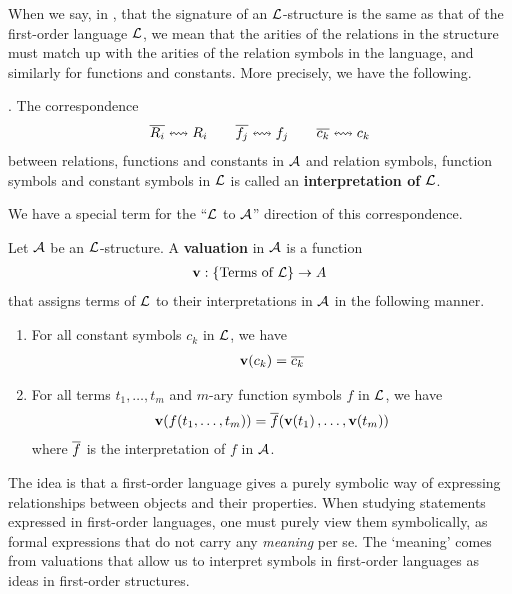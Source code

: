 When we say, in , that the signature of an $\mathcal{L}$-structure is the same as that of the first-order language $\mathcal{L}$, we mean that the arities of the relations in the structure must match up with the arities of the relation symbols in the language, and similarly for functions and constants. More precisely, we have the following.

\begin{boxdefinition}[Interpretation]
    \Letal. The correspondence
    \begin{align*}
        \overline{R_i} \leftrightsquigarrow R_i
        \qquad
        \overline{f_j} \leftrightsquigarrow f_j
        \qquad
        \overline{c_k} \leftrightsquigarrow c_k
    \end{align*}
    between relations, functions and constants in $\mathcal{A}$ and relation symbols, function symbols and constant symbols in $\mathcal{L}$ is called an \textbf{interpretation of $\mathcal{L}$}.
\end{boxdefinition}

We have a special term for the ``$\mathcal{L}$ to $\mathcal{A}$'' direction of this correspondence.

\begin{boxdefinition}[Valuation]\label{Ch2:Def:Valuation}
    Let $\mathcal{A}$ be an $\mathcal{L}$-structure. A \textbf{valuation} in $\mathcal{A}$ is a function
    \begin{align*}
        \mathbf{v} : \left\{ \text{Terms of } \mathcal{L} \right\} \to A
    \end{align*}
    that assigns terms of $\mathcal{L}$ to their interpretations in $\mathcal{A}$ in the following manner.
    \begin{enumerate}
        \item For all constant symbols $c_k$ in $\mathcal{L}$, we have
        \begin{align*}
            \mathbf{v}\!\left( c_k \right) = \overline{c_k}
        \end{align*}
        
        \item For all terms $t_1, \ldots, t_m$ and $m$-ary function symbols $f$ in $\mathcal{L}$, we have
        \begin{align*}
            \mathbf{v}\!\left( f\!\left( t_1, \ldots, t_m \right) \right) = \overline{f}\!\left( \mathbf{v}\!\left( t_1 \right), \ldots, \mathbf{v}\!\left( t_m \right) \right)
        \end{align*}
        where $\overline{f}$ is the interpretation of $f$ in $\mathcal{A}$.
    \end{enumerate}
\end{boxdefinition}

The idea is that a first-order language gives a purely symbolic way of expressing relationships between objects and their properties. When studying statements expressed in first-order languages, one must purely view them symbolically, as formal expressions that do not carry any \textit{meaning} per se. The `meaning' comes from valuations that allow us to interpret symbols in first-order languages as ideas in first-order structures.

